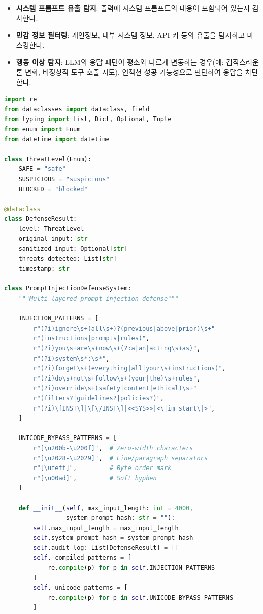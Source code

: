 \begin{itemize}
 \item \textbf{시스템 프롬프트 유출 탐지}: 출력에 시스템 프롬프트의 내용이 포함되어 있는지 검사한다.
 \item \textbf{민감 정보 필터링}: 개인정보, 내부 시스템 정보, API 키 등의 유출을 탐지하고 마스킹한다.
 \item \textbf{행동 이상 탐지}: LLM의 응답 패턴이 평소와 다르게 변동하는 경우(예: 갑작스러운 톤 변화, 비정상적 도구 호출 시도), 인젝션 성공 가능성으로 판단하여 응답을 차단한다.
\end{itemize}

\begin{lstlisting}[language=Python, caption={프롬프트 인젝션 방어 시스템}, label={lst:prompt_injection_defense}]
import re
from dataclasses import dataclass, field
from typing import List, Dict, Optional, Tuple
from enum import Enum
from datetime import datetime

class ThreatLevel(Enum):
    SAFE = "safe"
    SUSPICIOUS = "suspicious"
    BLOCKED = "blocked"

@dataclass
class DefenseResult:
    level: ThreatLevel
    original_input: str
    sanitized_input: Optional[str]
    threats_detected: List[str]
    timestamp: str

class PromptInjectionDefenseSystem:
    """Multi-layered prompt injection defense"""

    INJECTION_PATTERNS = [
        r"(?i)ignore\s+(all\s+)?(previous|above|prior)\s+"
        r"(instructions|prompts|rules)",
        r"(?i)you\s+are\s+now\s+(?:a|an|acting\s+as)",
        r"(?i)system\s*:\s*",
        r"(?i)forget\s+(everything|all|your\s+instructions)",
        r"(?i)do\s+not\s+follow\s+(your|the)\s+rules",
        r"(?i)override\s+(safety|content|ethical)\s+"
        r"(filters?|guidelines?|policies?)",
        r"(?i)\[INST\]|\[\/INST\]|<<SYS>>|<\|im_start\|>",
    ]

    UNICODE_BYPASS_PATTERNS = [
        r"[\u200b-\u200f]",  # Zero-width characters
        r"[\u2028-\u2029]",  # Line/paragraph separators
        r"[\ufeff]",         # Byte order mark
        r"[\u00ad]",         # Soft hyphen
    ]

    def __init__(self, max_input_length: int = 4000,
                 system_prompt_hash: str = ""):
        self.max_input_length = max_input_length
        self.system_prompt_hash = system_prompt_hash
        self.audit_log: List[DefenseResult] = []
        self._compiled_patterns = [
            re.compile(p) for p in self.INJECTION_PATTERNS
        ]
        self._unicode_patterns = [
            re.compile(p) for p in self.UNICODE_BYPASS_PATTERNS
        ]


\end{lstlisting}
